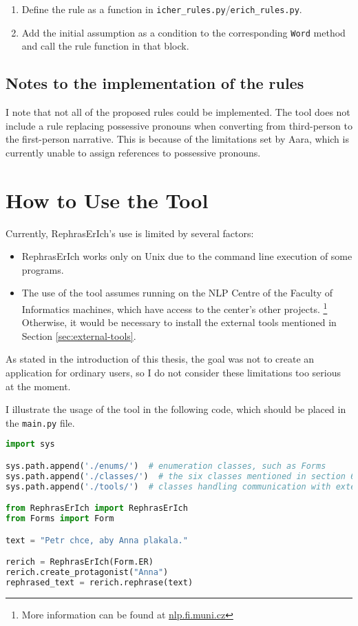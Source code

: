 \begin{enumerate}
	\item Define the rule as a function in \texttt{icher\_rules.py}/\texttt{erich\_rules.py}.
	\item Add the initial assumption as a condition to the corresponding \texttt{Word} method and call the rule function in that block.
\end{enumerate}

\subsection*{Notes to the implementation of the rules}

I note that not all of the proposed rules could be implemented. The tool does not include a rule replacing possessive pronouns when converting from third-person to the first-person narrative. This is because of the limitations set by Aara, which is currently unable to assign references to possessive pronouns.

\section{How to Use the Tool}

Currently, RephrasErIch's use is limited by several factors:

\begin{itemize}
	\item RephrasErIch works only on Unix due to the command line execution of some programs.
	\item The use of the tool assumes running on the NLP Centre of the Faculty of Informatics machines, which have access to the center's other projects. \footnote{More information can be found at \href{https://nlp.fi.muni.cz}{nlp.fi.muni.cz}} Otherwise, it would be necessary to install the external tools mentioned in Section \ref{sec:external-tools}.
\end{itemize}

As stated in the introduction of this thesis, the goal was not to create an application for ordinary users, so I do not consider these limitations too serious at the moment.

I illustrate the usage of the tool in the following code, which should be placed in the \texttt{main.py} file.
\newline

\begin{lstlisting}[language=Python]
import sys

sys.path.append('./enums/')  # enumeration classes, such as Forms
sys.path.append('./classes/')  # the six classes mentioned in section 6.2
sys.path.append('./tools/')  # classes handling communication with external tools

from RephrasErIch import RephrasErIch
from Forms import Form

text = "Petr chce, aby Anna plakala."

rerich = RephrasErIch(Form.ER)
rerich.create_protagonist("Anna")
rephrased_text = rerich.rephrase(text)
\end{lstlisting}


